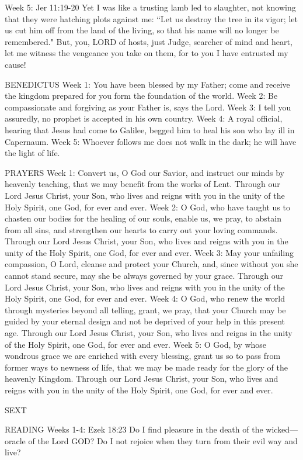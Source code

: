 Week 5:  Jer 11:19-20  Yet I was like a trusting lamb led to slaughter, not knowing that they were hatching plots against me: “Let us destroy the tree in its vigor; let us cut him off from the land of the living, so that his name will no longer be remembered." But, you, LORD of hosts, just Judge, searcher of mind and heart, let me witness the vengeance you take on them, for to you I have entrusted my cause!

BENEDICTUS
Week 1:	You have been blessed by my Father; come and receive the kingdom prepared for you form the foundation of the world.
Week 2:	Be compassionate and forgiving as your Father is, says the Lord.
Week 3:	I tell you assuredly, no prophet is accepted in his own country.
Week 4:	A royal official, hearing that Jesus had come to Galilee, begged him to heal his son who lay ill in Capernaum.
Week 5:	Whoever follows me does not walk in the dark; he will have the light of life.

PRAYERS
Week 1:	Convert us, O God our Savior, and instruct our minds by heavenly teaching, that we may benefit from the works of Lent. Through our Lord Jesus Christ, your Son, who lives and reigns with you in the unity of the Holy Spirit, one God, for ever and ever.
Week 2:	O God, who have taught us to chasten our bodies for the healing of our souls, enable us, we pray, to abstain from all sins, and strengthen our hearts to carry out your loving commands. Through our Lord Jesus Christ, your Son, who lives and reigns with you in the unity of the Holy Spirit, one God, for ever and ever.
Week 3:	May your unfailing compassion, O Lord, cleanse and protect your Church, and, since without you she cannot stand secure, may she be always governed by your grace. Through our Lord Jesus Christ, your Son, who lives and reigns with you in the unity of the Holy Spirit, one God, for ever and ever.
Week 4:	O God, who renew the world through mysteries beyond all telling, grant, we pray, that your Church may be guided by your eternal design and not be deprived of your help in this present age. Through our Lord Jesus Christ, your Son, who lives and reigns in the unity of the Holy Spirit, one God, for ever and ever.
Week 5:	O God, by whose wondrous grace we are enriched with every blessing, grant us so to pass from former ways to newness of life, that we may be made ready for the glory of the heavenly Kingdom. Through our Lord Jesus Christ, your Son, who lives and reigns with you in the unity of the Holy Spirit, one God, for ever and ever.

\begin{flushleft}\normalsize{\uppercase{SEXT\\}}\end{flushleft}
READING
Weeks 1-4:    Ezek 18:23    Do I find pleasure in the death of the wicked—oracle of the Lord GOD? Do I not rejoice when they turn from their evil way and live? 

